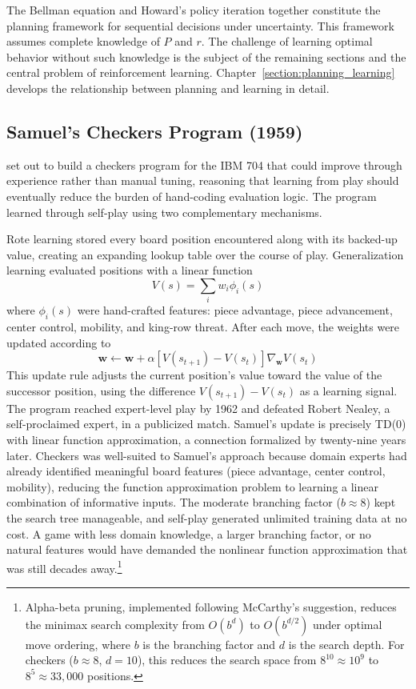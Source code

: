 The Bellman equation and Howard's policy iteration together constitute the planning framework for sequential decisions under uncertainty. This framework assumes complete knowledge of $P$ and $r$. The challenge of learning optimal behavior without such knowledge is the subject of the remaining sections and the central problem of reinforcement learning. Chapter~\ref{section:planning_learning} develops the relationship between planning and learning in detail.

\subsection{Samuel's Checkers Program (1959)}

\citet{Samuel1959} set out to build a checkers program for the IBM 704 that could improve through experience rather than manual tuning, reasoning that learning from play should eventually reduce the burden of hand-coding evaluation logic. The program learned through self-play using two complementary mechanisms.

Rote learning stored every board position encountered along with its backed-up value, creating an expanding lookup table over the course of play. Generalization learning evaluated positions with a linear function
\begin{equation}
V(s) = \sum_{i} w_i \phi_i(s)
\end{equation}
where $\phi_i(s)$ were hand-crafted features: piece advantage, piece advancement, center control, mobility, and king-row threat. After each move, the weights were updated according to
\begin{equation}
\mathbf{w} \leftarrow \mathbf{w} + \alpha \left[ V(s_{t+1}) - V(s_t) \right] \nabla_{\mathbf{w}} V(s_t)
\end{equation}
This update rule adjusts the current position's value toward the value of the successor position, using the difference $V(s_{t+1}) - V(s_t)$ as a learning signal. The program reached expert-level play by 1962 and defeated Robert Nealey, a self-proclaimed expert, in a publicized match. Samuel's update is precisely TD(0) with linear function approximation, a connection formalized by \citet{sutton1988} twenty-nine years later. Checkers was well-suited to Samuel's approach because domain experts had already identified meaningful board features (piece advantage, center control, mobility), reducing the function approximation problem to learning a linear combination of informative inputs. The moderate branching factor ($b \approx 8$) kept the search tree manageable, and self-play generated unlimited training data at no cost. A game with less domain knowledge, a larger branching factor, or no natural features would have demanded the nonlinear function approximation that was still decades away.\footnote{Alpha-beta pruning, implemented following McCarthy's suggestion, reduces the minimax search complexity from $O(b^d)$ to $O(b^{d/2})$ under optimal move ordering, where $b$ is the branching factor and $d$ is the search depth. For checkers ($b \approx 8$, $d = 10$), this reduces the search space from $8^{10} \approx 10^9$ to $8^5 \approx 33{,}000$ positions.}

